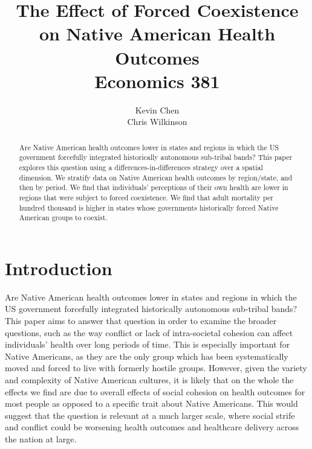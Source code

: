 \documentclass[12pt]{article}
\title{
The Effect of Forced Coexistence \\ on Native American Health Outcomes \\ 
{\small \sc Economics 381}
}
\author{Kevin Chen \\ Chris Wilkinson}
\begin{document}

\maketitle

\begin{abstract}
Are Native American health outcomes lower in states and regions in which the US government forcefully integrated historically autonomous sub-tribal bands? This paper explores this question using a differences-in-differences strategy over a spatial dimension. We stratify data on Native American health outcomes by region/state, and then by period. We find that individuals' perceptions of their own health are lower in regions that were subject to forced coexistence. We find that adult mortality per hundred thousand is higher in states whose governments historically forced Native American groups to coexist.
\end{abstract}

\newpage

\doublespacing

\section{Introduction}
Are Native American health outcomes lower in states and regions in which the US government forcefully integrated historically autonomous sub-tribal bands?  This paper aims to answer that question in order to examine the broader questions, such as the way conflict or lack of intra-societal cohesion can affect individuals’ health over long periods of time. This is especially important for Native Americans, as they are the only group which has been systematically moved and forced to live with formerly hostile groups.  However, given the variety and complexity of Native American cultures, it is likely that on the whole the effects we find are due to overall effects of social cohesion on health outcomes for most people as opposed to a specific trait about Native Americans.  This would suggest that the question is relevant at a much larger scale, where social strife and conflict could be worsening health outcomes and healthcare delivery across the nation at large.
\end{document}
